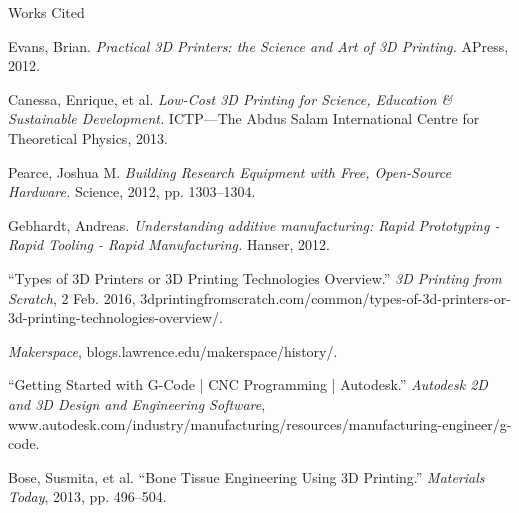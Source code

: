 \documentclass[12pt]{article}
\newcommand{\bibent}{\noindent \hangindent 40pt}
\newenvironment{workscited}{\newpage \begin{center} Works Cited \end{center}}{\newpage }
\begin{document}
\begin{flushleft}
\begin{workscited}
\bibent
Evans, Brian. \textit{Practical 3D Printers: the Science and Art of 3D Printing.} APress, 2012.

\bibent
Canessa, Enrique, et al. \textit{Low-Cost 3D Printing for Science, Education \& Sustainable Development.} ICTP—The Abdus Salam International Centre for Theoretical Physics, 2013.

\bibent
Pearce, Joshua M. \textit{Building Research Equipment with Free, Open-Source Hardware.} Science, 2012, pp. 1303–1304.

\bibent
Gebhardt, Andreas. \textit{Understanding additive manufacturing: Rapid Prototyping - Rapid Tooling - Rapid Manufacturing.} Hanser, 2012.

\bibent
``Types of 3D Printers or 3D Printing Technologies Overview.'' \textit{3D Printing from Scratch}, 2 Feb. 2016, 3dprintingfromscratch.com/common/types-of-3d-printers-or-3d-printing-technologies-overview/.

\bibent
\textit{Makerspace}, blogs.lawrence.edu/makerspace/history/.

\bibent
``Getting Started with G-Code | CNC Programming | Autodesk.'' \textit{Autodesk 2D and 3D Design and Engineering Software}, www.autodesk.com/industry/manufacturing/resources/manufacturing-engineer/g-code.

\bibent
Bose, Susmita, et al. ``Bone Tissue Engineering Using 3D Printing.'' \textit{Materials Today}, 2013, pp. 496–504.

\end{workscited}

\end{flushleft}
\end{document}
